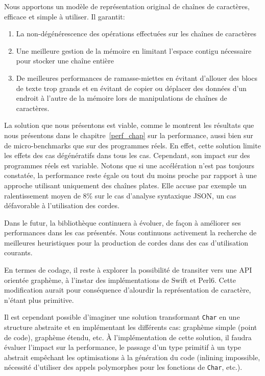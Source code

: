 \begin{conclusion}
Nous apportons un modèle de représentation original de chaînes de caractères, efficace et simple à utiliser.
Il garantit:
\begin{enumerate}
	\item La non-dégénérescence des opérations effectuées sur les chaînes de caractères
	\item Une meilleure gestion de la mémoire en limitant l'espace contigu nécessaire pour stocker une chaîne entière
	\item De meilleures performances de ramasse-miettes en évitant d'allouer des blocs de
		texte trop grands et en évitant de copier ou déplacer des données d'un endroit à l'autre de
		la mémoire lors de manipulations de chaînes de caractères.
\end{enumerate}

La solution que nous présentons est viable, comme le montrent les résultats que nous présentons dans le
chapitre~\ref{perf_chap} sur la performance, aussi bien sur de micro-benchmarks que sur des programmes réels.
En effet, cette solution limite les effets des cas dégénératifs dans tous les cas.
Cependant, son impact sur des programmes réels est variable.
Notons que si une accélération n'est pas toujours constatée, la performance reste égale ou tout du moins
proche par rapport à une approche utilisant uniquement des chaînes plates.
Elle accuse par exemple un ralentissement moyen de 8\% sur le cas d'analyse syntaxique JSON, un cas
défavorable à l'utilisation des cordes.

Dans le futur, la bibliothèque continuera à évoluer, de façon à améliorer ses performances
dans les cas présentés.
Nous continuons activement la recherche de meilleures heuristiques pour la production de cordes
dans des cas d'utilisation courants.

En termes de codage, il reste à explorer la possibilité de transiter vers une API orientée graphème,
à l'instar des implémentations de Swift et Perl6.
Cette modification aurait pour conséquence d'alourdir la représentation de caractère, n'étant plus
primitive.

Il est cependant possible d'imaginer une solution transformant \texttt{Char} en une structure abstraite
et en implémentant les différents cas: graphème simple (point de code), graphème étendu, etc.
À l'implémentation de cette solution, il faudra évaluer l'impact sur la performance, le passage
d'un type primitif à un type abstrait empêchant les optimisations à la génération du code (inlining
impossible, nécessité d'utiliser des appels polymorphes pour les fonctions de \texttt{Char}, etc.).


\end{conclusion}
